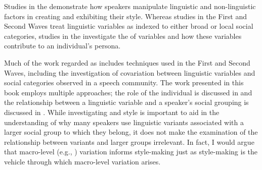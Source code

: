 
Studies in the  demonstrate how speakers manipulate linguistic and non-linguistic factors in creating and exhibiting their style. Whereas studies in the First and Second Waves treat linguistic variables as indexed to either broad or local social categories, studies in the  investigate the  of variables and how these variables contribute to an individual's persona. 

Much of the work regarded as  includes techniques used in the First and Second Waves, including the investigation of covariation between linguistic variables and social categories observed in a speech community. The work presented in this book employs multiple approaches; the role of the individual is discussed in  and the relationship between a linguistic variable and a speaker's social grouping is discussed in . While investigating  and style is important to aid in the understanding of why many speakers use linguistic variants associated with a larger social group to which they belong, it does not make the examination of the relationship between variants and larger groups irrelevant. In fact, I would argue that macro-level (e.g., ) variation informs style-making just as style-making is the vehicle through which macro-level variation arises.


  

